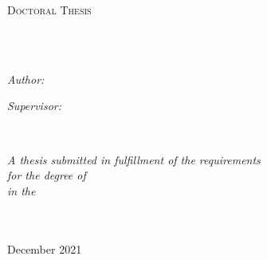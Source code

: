 \documentclass[
11pt, 
english, 
doublespacing, %
headsepline, %
usenames,dvipsnames
]{dissertation_class} %
\author{Benjamin \textsc{Smithers}} %
\numberwithin{figure}{section}
\numberwithin{table}{section}
\numberwithin{equation}{section}
\begin{document}
\begin{titlepage}
    \begin{center}
    
    \vspace*{.06\textheight}
    {\scshape\LARGE \univname\par}\vspace{1.5cm} %
    \textsc{\Large Doctoral Thesis}\\[0.5cm] %
    
    \HRule \\[0.4cm] %
    {\huge \bfseries \ttitle\par}\vspace{0.4cm} %
    \HRule \\[1.5cm] %
     
    \begin{minipage}[t]{0.4\textwidth}
    \begin{flushleft} \large
    \emph{Author:}\\
    \href{https://nures.uta.edu/collaborators/}{\authorname} %
    \end{flushleft}
    \end{minipage}
    \begin{minipage}[t]{0.4\textwidth}
    \begin{flushright} \large
    \emph{Supervisor:} \\
    \href{https://nures.uta.edu/collaborators/}{\supname} %
    \end{flushright}
    \end{minipage}\\[3cm]
     
    \vfill
    
    \large \textit{A thesis submitted in fulfillment of the requirements\\ for the degree of \degreename}\\[0.3cm] %
    \textit{in the}\\[0.4cm]
    \groupname\\\deptname\\[2cm] %
     
    \vfill
    
    {\large {December 2021}}\\[4cm] %
     
    \vfill
    \end{center}
\end{titlepage}
    
\end{document}
